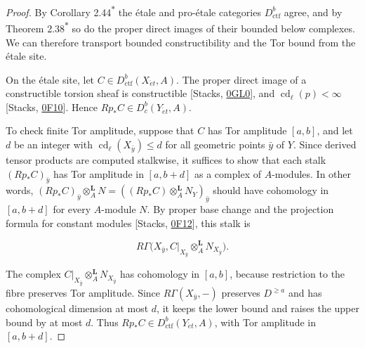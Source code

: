 \documentclass[11pt]{article}
\newcommand{\bpout}[1]{#1\textsuperscript{\hyperlink{bp-outside}{\ensuremath{\ast}}}}
\providecommand{\Dbc}{}\renewcommand{\Dbc}{D^b_c}
\begin{document}
\begin{proof}[{Proof}]\label{bp107}%
By Corollary \bpout{2.44} the étale and pro-étale categories \(D^b_{\mathrm{ctf}}\) agree, and by Theorem \bpout{2.38} so do the proper direct images of their bounded below complexes. We can therefore transport bounded constructibility and the Tor bound from the étale site.

On the étale site, let \(C\in D^b_{\mathrm{ctf}}(X_{\acute{e}t},A)\). The proper direct image of a constructible torsion sheaf is constructible [Stacks, \href{https://stacks.math.columbia.edu/tag/0GL0}{0GL0}], and \(\operatorname{cd}_\ell(p)<\infty\) [Stacks, \href{https://stacks.math.columbia.edu/tag/0F10}{0F10}]. Hence \(Rp_*C\in\Dbc(Y_{\acute{e}t},A)\).

To check finite Tor amplitude, suppose that \(C\) has Tor amplitude \([a,b]\), and let \(d\) be an integer with \(\operatorname{cd}_\ell(X_{\bar y})\leq d\) for all geometric points \(\bar y\) of \(Y\). Since derived tensor products are computed stalkwise, it suffices to show that each stalk \((Rp_*C)_{\bar y}\) has Tor amplitude in \([a,b+d]\) as a complex of \(A\)-modules. In other words, \((Rp_*C)_{\bar y}\otimes^{\mathbf L}_AN=((Rp_*C)\otimes_A^{\mathbf L}N_Y)_{\bar y}\) should have cohomology in \([a,b+d]\) for every \(A\)-module \(N\). By proper base change and the projection formula for constant modules [Stacks, \href{https://stacks.math.columbia.edu/tag/0F12}{0F12}], this stalk is

\[
R\Gamma\bigl(X_{\bar y},
C|_{X_{\bar y}}\otimes_A^{\mathbf L}N_{X_{\bar y}}\bigr).
\]

The complex \(C|_{X_{\bar y}}\otimes_A^{\mathbf L}N_{X_{\bar y}}\) has cohomology in \([a,b]\), because restriction to the fibre preserves Tor amplitude. Since \(R\Gamma(X_{\bar y},-)\) preserves \(D^{\geq a}\) and has cohomological dimension at most \(d\), it keeps the lower bound and raises the upper bound by at most \(d\). Thus \(Rp_*C\in D^b_{\mathrm{ctf}}(Y_{\acute{e}t},A)\), with Tor amplitude in \([a,b+d]\).
\end{proof}


\end{document}
